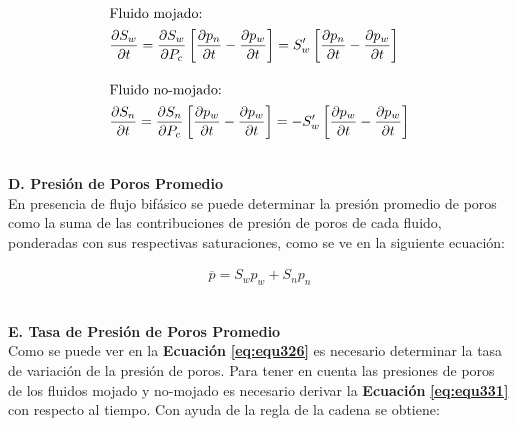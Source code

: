 \begin{ceqn} 
\begin{subequations} \label{eq:equ330} 
\begin{align}
\shortintertext{Fluido mojado:}     &\frac{\partial S_w}{\partial t} = \frac{\partial S_w}{\partial P_c}\left[\frac{\partial p_n}{\partial t}-\frac{\partial p_w}{\partial t}\right] = S'_w\left[\frac{\partial p_n}{\partial t}-\frac{\partial p_w}{\partial t}\right] \label{eq:equ330a} \\[10pt]
\shortintertext{Fluido no-mojado:} 	&\frac{\partial S_n}{\partial t} = \frac{\partial S_n}{\partial P_c}\left[\frac{\partial p_w}{\partial t}-\frac{\partial p_w}{\partial t}\right] = -S'_w\left[\frac{\partial p_w}{\partial t}-\frac{\partial p_w}{\partial t}\right] \label{eq:equ330b}
\end{align}
\end{subequations} 
\end{ceqn}
\\
\textbf{D. Presión de Poros Promedio}
\\
En presencia de flujo bifásico se puede determinar la presión promedio de poros como la suma de las contribuciones de presión de poros de cada fluido, ponderadas con sus respectivas saturaciones, como se ve en la siguiente ecuación:

\begin{ceqn} 
\begin{gather} \label{eq:equ331} 
\overline{p} = S_w p_w + S_n p_n
\end{gather}  
\end{ceqn}
\\
\textbf{E. Tasa de Presión de Poros Promedio}
\\
Como se puede ver en la \textbf{Ecuación} \textbf{\ref{eq:equ326}} es necesario determinar la tasa de variación de la presión de poros. Para tener en cuenta las presiones de poros de los fluidos mojado y no-mojado es necesario derivar la \textbf{Ecuación} \textbf{\ref{eq:equ331}} con respecto al tiempo. Con ayuda de la regla de la cadena se obtiene:\bigskip

